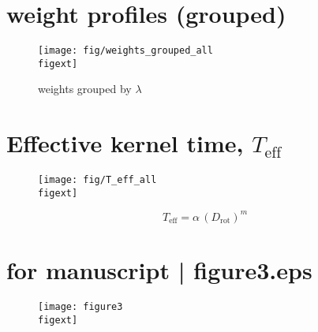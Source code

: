 \documentclass{article}
\begin{document}
\section*{weight profiles (grouped)}

\begin{figure}[H]
\begin{center}
\hspace*{-1cm}\texttt{[image: fig/weights\_grouped\_all\\figext]}
\end{center}
\caption{weights grouped by $\lambda$}
\end{figure}

\section*{Effective kernel time, $T_\mathrm{eff}$}

\begin{minipage}{0.55\textwidth}
\begin{figure}[H]
\texttt{[image: fig/T\_eff\_all\\figext]}
\end{figure}
\end{minipage}
\begin{minipage}{0.25\textwidth}
\begin{equation*}
T_{\mathrm{eff}} = \alpha \, (D_{\mathrm{rot}})^m
\end{equation*}
\end{minipage}\hfill


\section*{for manuscript | figure3.eps}
\begin{figure}[H]
\texttt{[image: figure3\\figext]}
\end{figure}
\thispagestyle{empty}
\end{document}

